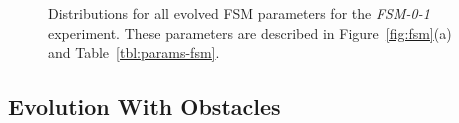 \begin{figure}[!ht]
    \centering







    \caption{Distributions for all evolved FSM parameters for the \emph{FSM-0-1} experiment. These parameters are described in Figure~\ref{fig:fsm}(a) and Table~\ref{tbl:params-fsm}.}
    \label{fig:FSM-best-params}
\end{figure}


\subsection{Evolution With Obstacles}



